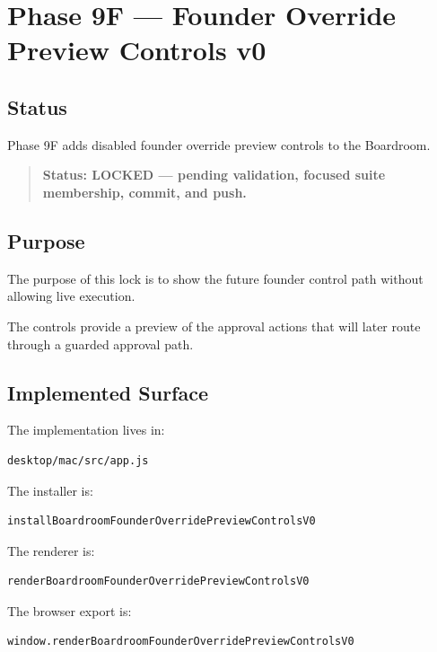 \section{Phase 9F --- Founder Override Preview Controls v0}
\label{sec:aion-boardroom-founder-override-preview-controls-v0}

\subsection{Status}

Phase 9F adds disabled founder override preview controls to the Boardroom.

\begin{quote}
\textbf{Status: LOCKED --- pending validation, focused suite membership, commit, and push.}
\end{quote}

\subsection{Purpose}

The purpose of this lock is to show the future founder control path without allowing live execution.

The controls provide a preview of the approval actions that will later route through a guarded approval path.

\subsection{Implemented Surface}

The implementation lives in:

\begin{verbatim}
desktop/mac/src/app.js
\end{verbatim}

The installer is:

\begin{verbatim}
installBoardroomFounderOverridePreviewControlsV0
\end{verbatim}

The renderer is:

\begin{verbatim}
renderBoardroomFounderOverridePreviewControlsV0
\end{verbatim}

The browser export is:

\begin{verbatim}
window.renderBoardroomFounderOverridePreviewControlsV0
\end{verbatim}

